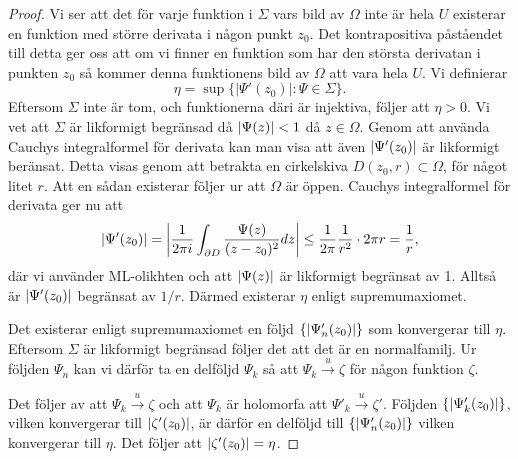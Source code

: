 \begin{proof}
	Vi ser att det för varje funktion i $\Sigma$ vars bild av $\Omega$ inte är hela $U$ existerar en funktion med större derivata i någon punkt $z_0$. Det kontrapositiva påståendet till detta ger oss att om vi finner en funktion som har den största derivatan i punkten $z_0$ så kommer denna funktionens bild av $\Omega$ att vara hela $U$. Vi definierar
	\begin{equation*}
		\eta = \sup \{ |\Psi'(z_0)| : \Psi \in \Sigma \}.
	\end{equation*}
	Eftersom $\Sigma$ inte är tom, och funktionerna däri är injektiva, följer att $\eta > 0$. Vi vet att $\Sigma$ är likformigt begränsad då $\left\lvert \Psi(z) \right\rvert < 1$ då $z \in \Omega$. Genom att använda Cauchys integralformel för derivata kan man visa att även $\left\lvert \Psi'(z_0) \right\rvert$ är likformigt beränsat. Detta visas genom att betrakta en cirkelskiva $D(z_0, r) \subset \Omega$, för något litet $r$. Att en sådan existerar följer ur att $\Omega$ är öppen. Cauchys integralformel för derivata ger nu att
	\begin{equation*}
		\left\lvert \Psi'(z_0) \right\rvert = \left\lvert \frac{1}{2\pi i} \int_{\partial D}{\frac{\Psi(z)}{(z-z_0)^2} dz} \right\rvert \le \frac{1}{2\pi}\frac{1}{r^2} \cdot 2\pi r = \frac{1}{r},
	\end{equation*}
	där vi använder ML-olikhten och att $\left\lvert \Psi(z) \right\rvert$ är likformigt begränsat av 1. Alltså är $\left\lvert \Psi'(z_0) \right\rvert$ begränsat av $1/r$. Därmed existerar $\eta$ enligt supremumaxiomet.

	Det existerar enligt supremumaxiomet en följd $\{\left\lvert \Psi'_n(z_0) \right\rvert\}$ som konvergerar till $\eta$. Eftersom $\Sigma$ är likformigt begränsad följer det att det är en normalfamilj. Ur följden $\Psi_n$ kan vi därför ta en delföljd $\Psi_k$ så att $\Psi_k \xrightarrow{u} \zeta$ för någon funktion $\zeta$.

	Det följer av att $\Psi_k \xrightarrow{u} \zeta$ och att $\Psi_k$ är holomorfa att $\Psi'_k \xrightarrow{u} \zeta'$. Följden $\{\left\lvert \Psi'_k(z_0) \right\rvert\}$, vilken konvergerar till $\left\lvert \zeta'(z_0) \right\rvert$, är därför en delföljd till $\{\left\lvert \Psi'_n(z_0) \right\rvert\}$ vilken konvergerar till $\eta$. Det följer att $\left\lvert \zeta'(z_0) \right\rvert=\eta$.


\end{proof}
